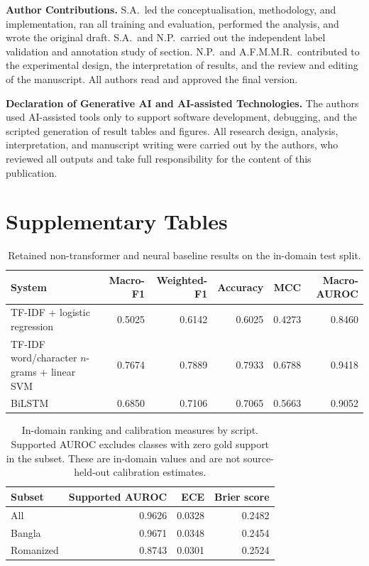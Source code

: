\documentclass[11pt,a4paper]{article}
\def\cref#1{section}%
\begin{document}
\noindent\textbf{Author Contributions.} S.A.\ led the conceptualisation, methodology, and implementation, ran all training and evaluation, performed the analysis, and wrote the original draft. S.A.\ and N.P.\ carried out the independent label validation and annotation study of \cref{sec:taxonomy}. N.P.\ and A.F.M.M.R.\ contributed to the experimental design, the interpretation of results, and the review and editing of the manuscript. All authors read and approved the final version.

\noindent\textbf{Declaration of Generative AI and AI-assisted Technologies.} The authors used AI-assisted tools only to support software development, debugging, and the scripted generation of result tables and figures. All research design, analysis, interpretation, and manuscript writing were carried out by the authors, who reviewed all outputs and take full responsibility for the content of this publication.

\appendix
\section{Supplementary Tables}
\label{sec:appendix}

\begin{table}[!htbp]
\centering
\caption{Retained non-transformer and neural baseline results on the in-domain test split.}
\label{tab:baseline-full}
\small
\begin{tabular}{@{}lrrrrr@{}}
\toprule
\textbf{System} & \textbf{Macro-F1} & \textbf{Weighted-F1} & \textbf{Accuracy} & \textbf{MCC} & \textbf{Macro-AUROC} \\
\midrule
TF-IDF + logistic regression & 0.5025 & 0.6142 & 0.6025 & 0.4273 & 0.8460 \\
TF-IDF word/character $n$-grams + linear SVM & 0.7674 & 0.7889 & 0.7933 & 0.6788 & 0.9418 \\
BiLSTM & 0.6850 & 0.7106 & 0.7065 & 0.5663 & 0.9052 \\
\bottomrule
\end{tabular}
\end{table}

\begin{table}[!htbp]
\centering
\caption{In-domain ranking and calibration measures by script. Supported AUROC excludes classes with zero gold support in the subset. These are in-domain values and are not source-held-out calibration estimates.}
\label{tab:calibration}
\small
\begin{tabular}{@{}lrrr@{}}
\toprule
\textbf{Subset} & \textbf{Supported AUROC} & \textbf{ECE} & \textbf{Brier score} \\
\midrule
All & 0.9626 & 0.0328 & 0.2482 \\
Bangla & 0.9671 & 0.0348 & 0.2454 \\
Romanized & 0.8743 & 0.0301 & 0.2524 \\
\bottomrule
\end{tabular}
\end{table}
\end{document}
